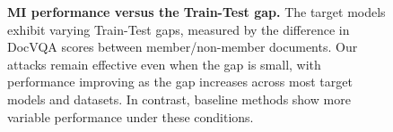 \begin{figure}[h]
    \centering
\caption{\textbf{MI performance versus the Train-Test gap.} The target models exhibit varying Train-Test gaps, measured by the difference in DocVQA scores between member/non-member documents. Our attacks remain effective even when the gap is small, with performance improving as the gap increases across most target models and datasets. In contrast, baseline methods show more variable performance under these conditions.}
\vspace{-0.1in}
\label{fig:F1_scoregap}
\end{figure}
